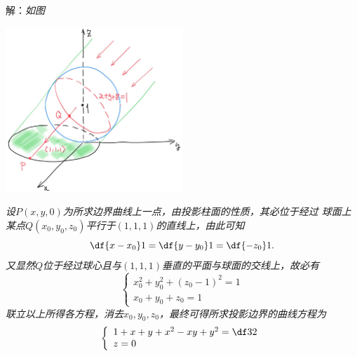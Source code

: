 \begin{frame}
	\linespread{1.5}
	
	
	\small 解：\it 如图
	\begin{center}
		\includegraphics[width=0.5\textwidth]{./images/ch8/sunray.jpg}
	\end{center}
\end{frame}

\begin{frame}
	\linespread{1.5}
	
	
	\small \it 
	设$P(x,y,0)$为所求边界曲线上一点，由投影柱面的性质，其必位于经过
	球面上某点$Q(x_0,y_0,z_0)$平行于$(1,1,1)$的直线上，由此可知
	$$\df{x-x_0}1=\df{y-y_0}1=\df{-z_0}1.$$
	又显然$Q$位于经过球心且与$(1,1,1)$垂直的平面与球面的交线上，故必有
	$$\left\{\begin{array}{l}
		x_0^2+y_0^2+(z_0-1)^2=1\\
		x_0+y_0+z_0=1
	\end{array}\right.$$
	联立以上所得各方程，消去$x_0,y_0,z_0$，最终可得所求投影边界的曲线方程为
	$$\left\{\begin{array}{l}
		1+x+y+x^2-xy+y^2=\df32\\
		z=0
	\end{array}\right.$$
	\fin
\end{frame}

